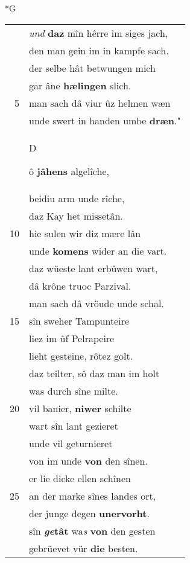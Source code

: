\documentclass[8pt,a4paper,notitlepage]{article}
\begin{document}
\newpage
\begin{table}[ht]
\begin{minipage}[t]{0.5\linewidth}
\small
\begin{center}*G
\end{center}
\begin{tabular}{rl}
 & \textit{und} \textbf{daz} mîn hêrre im siges jach,\\ 
 & den man gein im in kampfe sach.\\ 
 & der selbe hât betwungen mich\\ 
 & gar âne \textbf{hælingen} slich.\\ 
5 & man sach dâ viur ûz helmen wæn\\ 
 & unde swert in handen umbe \textbf{dræn}."\\ 
 & \begin{large}D\end{large}ô \textbf{jâhens} algelîche,\\ 
 & beidiu arm unde rîche,\\ 
 & daz Kay het missetân.\\ 
10 & hie sulen wir diz mære lân\\ 
 & unde \textbf{komens} wider an die vart.\\ 
 & daz wüeste lant erbûwen wart,\\ 
 & dâ krône truoc Parzival.\\ 
 & man sach dâ vröude unde schal.\\ 
15 & sîn sweher Tampunteire\\ 
 & liez im ûf Pelrapeire\\ 
 & lieht gesteine, rôtez golt.\\ 
 & daz teilter, sô daz man im holt\\ 
 & was durch sîne milte.\\ 
20 & vil banier, \textbf{niwer} schilte\\ 
 & wart sîn lant gezieret\\ 
 & unde vil geturnieret\\ 
 & von im unde \textbf{von} den sînen.\\ 
 & er lie dicke ellen schînen\\ 
25 & an der marke sînes landes ort,\\ 
 & der junge degen \textbf{unervorht}.\\ 
 & sîn \textbf{\textit{ge}tât} wa\textit{s} \textbf{von} den gesten\\ 
 & gebrüevet vür \textbf{die} besten.\\ 

\end{tabular}
\end{minipage}
\end{table}
\end{document}
